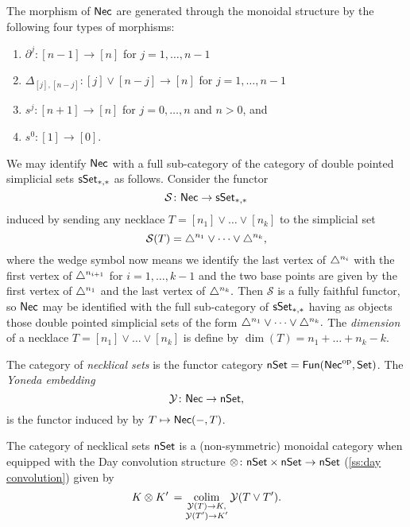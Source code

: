 The morphism of $\mathsf{Nec}$ are generated through the monoidal structure by the following four types of morphisms:
\begin{enumerate}
	\item $\partial^j \colon [n-1] \to [n]$ for $j = 1, \dots, n-1$
	\item $\Delta_{[j], [n-j]} \colon  [j] \vee [n-j] \to [n]$ for $j = 1, \dots, n-1$
	\item $s^j \colon [n+1] \to [n]$ for $j = 0, \dots, n$ and $n>0$, and 
	\item $s^0 \colon [1] \to [0]$.
\end{enumerate}
We may identify $\mathsf{Nec}$ with a full sub-category of the category of double pointed simplicial sets $\mathsf{sSet}_{*,*}$ as follows.
Consider the functor
\begin{equation*}
\mathcal{S} \colon \mathsf{Nec} \to \mathsf{sSet}_{*,*}
\end{equation*}
 induced by sending any necklace $T = [n_1] \vee \dots \vee[n_k]$ to the simplicial set
\begin{equation*}
\mathcal{S}(T)= \triangle^{n_1} \vee\dots \vee \triangle^{n_k},
\end{equation*}
where the wedge symbol now means we identify the last vertex of $\triangle^{n_i}$ with the first vertex of $\triangle^{n_{i+1}}$ for $i = 1, \dots, k-1$ and the two base points are given by the first vertex of $\triangle^{n_1}$ and the last vertex of $\triangle^{n_k}.$
Then $\mathcal{S}$ is a fully faithful functor, so $\mathsf{Nec}$ may be identified with the full sub-category of $\mathsf{sSet}_{*,*}$ having as objects those double pointed simplicial sets of the form $\triangle^{n_1} \vee \dots \vee \triangle^{n_k}.$
The \textit{dimension} of a necklace $T = [n_1] \vee \dots \vee[n_k]$ is define by $\dim(T) = n_1 + \dots + n_k-k$.

The category of \textit{necklical sets} is the functor category $\mathsf{nSet} = \mathsf{Fun}(\mathsf{Nec}^{\mathrm{op}}, \mathsf{Set})$.
The \textit{Yoneda embedding}
$$\mathcal{Y} \colon \mathsf{Nec} \to \mathsf{nSet},$$
is the functor induced by by $T \mapsto \mathsf{Nec}(-,T)$.

The category of necklical sets $\mathsf{nSet}$ is a (non-symmetric) monoidal category when equipped with the Day convolution structure $\otimes \colon \mathsf{nSet} \times \mathsf{nSet} \to \mathsf{nSet}$ (\cref{ss:day convolution}) given by
\begin{equation*}
K \otimes K' \, = \operatorname*{colim}_{\substack{\mathcal{Y}(T) \to K, \\ \mathcal{Y}(T')\to K'}} \mathcal{Y}(T \vee T').
\end{equation*}


